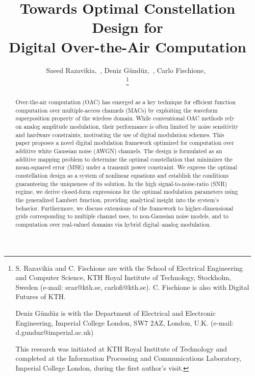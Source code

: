 \documentclass[journal,12pt,onecolumn,draftclsnofoot]{IEEEtran}
\theoremstyle{definition}
\begin{document}
%

\title{Towards Optimal Constellation Design for \\
Digital  Over-the-Air Computation}



\author{ Saeed Razavikia,~, Deniz Gündüz,~, Carlo Fischione,~




 \thanks{S. Razavikia and C. Fischione are with the School of Electrical Engineering and Computer Science, KTH Royal Institute of Technology, Stockholm, Sweden (e-mail: sraz@kth.se, carlofi@kth.se). C. Fischione is also with Digital Futures of KTH. 
 
Deniz Gündüz is with the Department of Electrical and Electronic Engineering, Imperial College London, SW7 2AZ, London, U.K. (e-mail:
d.gunduz@imperial.ac.uk)


This research was initiated at KTH Royal Institute of Technology and completed at the Information Processing and Communications Laboratory, Imperial College London, during the first author’s visit.

 }
 }



\maketitle




\begin{abstract}
Over-the-air computation (OAC) has emerged as a key technique for efficient function computation over multiple-access channels (MACs) by exploiting the waveform superposition property of the wireless domain.  While conventional OAC methods rely on analog amplitude modulation, their performance is often limited by noise sensitivity and hardware constraints, motivating the use of digital modulation schemes.  This paper proposes a novel digital modulation framework optimized for computation over additive white Gaussian noise (AWGN) channels. 
The design is formulated as an additive mapping problem to determine the optimal constellation that minimizes the mean-squared error (MSE) under a transmit power constraint.  We express the optimal constellation design as a system of nonlinear equations and establish the conditions guaranteeing the uniqueness of its solution.  In the high signal-to-noise-ratio (SNR) regime, we derive closed-form expressions for the optimal modulation parameters using the generalized Lambert function, providing analytical insight into the system’s behavior. Furthermore, we discuss extensions of the framework to higher-dimensional grids corresponding to multiple channel uses, to non-Gaussian noise models, and to computation over real-valued domains via hybrid digital–analog modulation. 
\end{abstract}
\end{document}

